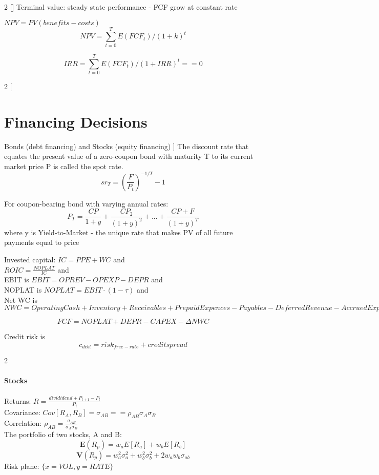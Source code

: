 \documentclass[9pt]{article}
\begin{document}
\begin{multicols}{2}
[]
Terminal value: steady state performance - FCF grow at constant rate

$NPV = PV(benefits - costs)$
$$
NPV = \sum_{t=0}^{T} E(FCF_t) / (1+k)^t
$$

$$
IRR = \sum_{t=0}^{T} E(FCF_t) / (1+IRR)^t == 0
$$

\end{multicols}

\begin{multicols}{2}
[
\section{Financing Decisions}
Bonds (debt financing) and Stocks (equity financing)
]
The discount rate that equates the present value of a zero-coupon bond
with maturity T to its current market price P is called the spot rate.
$$
	sr_T = (\frac{F}{P_t})^{-1/T} - 1
$$

For coupon-bearing bond with varying annual rates:
$$
	P_T = \frac{CP}{1+y} + \frac{CP_2}{(1+y)^2} + ... + \frac{CP+F}{(1+y)^T}	
$$ where y is Yield-to-Market - the unique rate that makes PV of all future payments equal to price

Invested capital: $ IC = PPE + WC $ and \\
$ ROIC = \frac{NOPLAT}{IC} $ and \\
EBIT is $ EBIT = OPREV - OPEXP - DEPR $ and \\
NOPLAT is $ NOPLAT = EBIT \cdot (1 - \tau) $ and \\
Net WC is $ NWC = Operating Cash+Inventory+Receivables+Prepaid Expences - Payables - Deferred Revenue - Accrued Expenses $

$$
	FCF = NOPLAT + DEPR - CAPEX - \Delta NWC
$$

Credit risk is $$ c_{debt} = risk_{free-rate} + credit spread $$
\end{multicols}

\begin{multicols}{2}
\paragraph{Stocks}
Returns: $ R = \frac{divididend + P_{t+1} - P_t} {P_t}$ \\
Covariance: $ Cov[R_A, R_B] = \sigma_{AB} == \rho_{AB}\sigma_A\sigma_B $ \\
Correlation: $ \rho_{AB} = \frac{\sigma_{AB}} {\sigma_A \sigma_B} $\\


The portfolio of two stocks, A and B: 
$$
	\mathbf{E}(R_p) = w_aE[R_a] + w_bE[R_b]
$$
$$
	\mathbf{V}(R_p) = w_a^2\sigma_a^2 + w_b^2\sigma_b^2 + 2 w_a w_b \sigma_{ab}
$$
Risk plane: $\{x=VOL, y=RATE\}$
\end{multicols}
\end{document}
